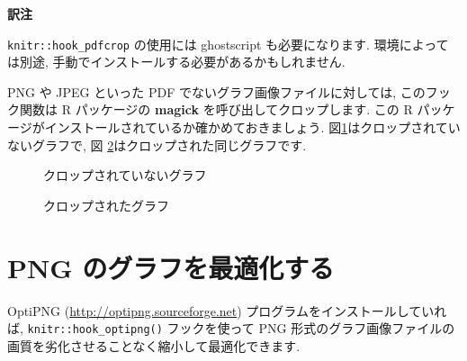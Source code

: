 \documentclass[
  11pt,
  lualatex,
  ja=standard]{bxjsreport}
\newenvironment{Shaded}{\begin{snugshade}}{\end{snugshade}}
\newcommand{\AttributeTok}[1]{\textcolor[rgb]{0.77,0.63,0.00}{#1}}
\newcommand{\FunctionTok}[1]{\textcolor[rgb]{0.00,0.00,0.00}{#1}}
\newcommand{\NormalTok}[1]{#1}
\newcommand{\SpecialCharTok}[1]{\textcolor[rgb]{0.00,0.00,0.00}{#1}}
\newenvironment{infobox}[1]{\begin{itemize}\renewcommand{\labelitemi}{\raisebox{-.7\height}[0pt][0pt]{%
  {\setkeys{Gin}{width=3em,keepaspectratio}\texttt{[image: \_latex/\_img/\#1]}}}}
  \setlength{\fboxsep}{1em}
  \begin{greyblock}
  \item
  }{\end{greyblock}\end{itemize}
}
\begin{document}
\begin{infobox}{memo}
\textbf{訳注}

\texttt{knitr::hook\_pdfcrop} の使用には ghostscript も必要になります. 環境によっては別途, 手動でインストールする必要があるかもしれません.

\end{infobox}

PNG や JPEG といった PDF でないグラフ画像ファイルに対しては, このフック関数は R パッケージの \textbf{magick} \autocite{R-magick}を呼び出してクロップします. この R パッケージがインストールされているか確かめておきましょう. 図\ref{fig:crop-no}はクロップされていないグラフで, 図 \ref{fig:crop-yes}はクロップされた同じグラフです.

\begin{figure}

{\centering {} 

}

\caption{クロップされていないグラフ}\label{fig:crop-no}
\end{figure}

\begin{figure}

{\centering {} 

}

\caption{クロップされたグラフ}\label{fig:crop-yes}
\end{figure}

\hypertarget{optipng}{%
\section{PNG のグラフを最適化する}\label{optipng}}

OptiPNG (\url{http://optipng.sourceforge.net}) プログラムをインストールしていれば, \texttt{knitr::hook\_optipng()} フックを使って PNG 形式のグラフ画像ファイルの画質を劣化させることなく縮小して最適化できます.

\begin{Shaded}
\end{Shaded}
\end{document}
